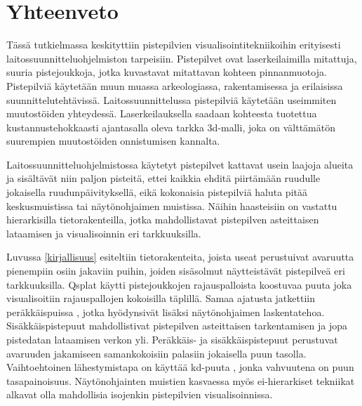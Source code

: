 \section{Yhteenveto}

Tässä tutkielmassa keskityttiin pistepilvien visualisointitekniikoihin erityisesti laitossuunnitteluohjelmiston tarpeisiin. Pistepilvet ovat laserkeilaimilla mitattuja, suuria pistejoukkoja, jotka kuvastavat mitattavan kohteen pinnanmuotoja. Pistepilviä käytetään muun muassa arkeologiassa, rakentamisessa ja erilaisissa suunnittelutehtävissä. Laitossuunnittelussa pistepilviä käytetään useimmiten muutostöiden yhteydessä. Laserkeilauksella saadaan kohteesta tuotettua kustannustehokkaasti ajantasalla oleva tarkka 3d-malli, joka on välttämätön suurempien muutostöiden onnistumisen kannalta.   


Laitossuunnitteluohjelmistossa käytetyt pistepilvet kattavat usein laajoja alueita ja sisältävät niin paljon pisteitä, ettei kaikkia ehditä piirtämään ruudulle jokaisella ruudunpäivityksellä, eikä kokonaisia pistepilviä haluta pitää keskusmuistissa tai näytönohjaimen muistissa. Näihin haasteisiin on vastattu hierarkisilla tietorakenteilla, jotka mahdollistavat pistepilven asteittaisen lataamisen ja visualisoinnin eri tarkkuuksilla. 

Luvussa \ref{kirjallisuus} esiteltiin tietorakenteita, joista useat perustuivat avaruutta pienempiin osiin jakaviin puihin, joiden sisäsolmut näytteistävät pistepilveä eri tarkkuuksilla. Qsplat \cite{qsplat} käytti pistejoukkojen rajauspalloista koostuvaa puuta joka visualisoitiin rajauspallojen kokoisilla täplillä. Samaa ajatusta jatkettiin peräkkäispuissa \cite{spt}\cite{ip}, jotka hyödynsivät lisäksi näytönohjaimen laskentatehoa. Sisäkkäispistepuut \cite{scheiblauer}\cite{potree} mahdollistivat pistepilven asteittaisen tarkentamisen ja jopa pistedatan lataamisen verkon yli. Peräkkäis- ja sisäkkäispistepuut perustuvat avaruuden jakamiseen samankokoisiin palasiin jokaisella puun tasolla. Vaihtoehtoinen lähestymistapa on käyttää kd-puuta \cite{richter}\cite{smooth}, jonka vahvuutena on puun tasapainoisuus. Näytönohjainten muistien kasvaessa myös ei-hierarkiset tekniikat \cite{clod}\cite{progressive} alkavat olla mahdollisia isojenkin pistepilvien visualisoinnissa. 

